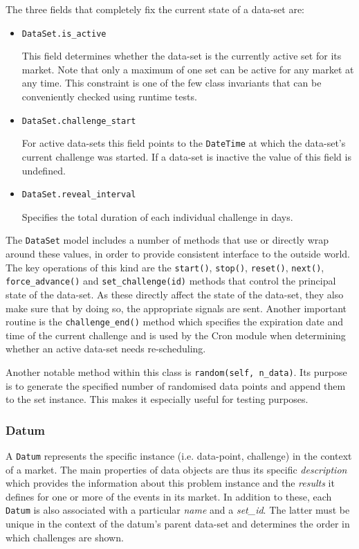 \documentclass[bsc,frontabs,twoside,singlespacing,parskip,deptreport]{infthesis}     %
\begin{document}
	The three fields that completely fix the current state of a data-set are:
\begin{itemize}

\item {\tt DataSet.is\_active}

	This field determines whether the data-set is the currently active set for its market. Note that only a maximum of one set can be active for any market at any time. This constraint is one of the few class invariants that can be conveniently checked using runtime tests. 

\item {\tt DataSet.challenge\_start}

	For active data-sets this field points to the {\tt DateTime} at which the data-set's current challenge was started. If a data-set is inactive the value of this field is undefined. 

\item {\tt DataSet.reveal\_interval}

	Specifies the total duration of each individual challenge in days. 

\end{itemize}

	The {\tt DataSet} model includes a number of methods that use or directly wrap around these values, in order to provide consistent interface to the outside world. The key operations of this kind are the {\tt start()}, {\tt stop()}, {\tt reset()}, {\tt next()}, {\tt force\_advance()} and {\tt set\_challenge(id)} methods that control the principal state of the data-set. As these directly affect the state of the data-set, they also make sure that by doing so, the appropriate signals are sent. Another important routine is the {\tt challenge\_end()} method which specifies the expiration date and time of the current challenge and is used by the Cron module when determining whether an active data-set needs re-scheduling. 

	Another notable method within this class is {\tt random(self, n\_data)}. Its purpose is to generate the specified number of randomised data points and append them to the set instance. This makes it especially useful for testing purposes. 
    
\subsubsection{Datum}

	A {\tt Datum} represents the specific instance (i.e. data-point, challenge) in the context of a market. The main properties of   data objects are thus its specific {\em description} which provides the information about this problem instance and the {\em results} it defines for one or more of the events in its market. In addition to these, each {\tt Datum} is also associated with a particular {\it name} and a {\it set\_id}. The latter must be unique in the context of the datum's parent data-set and determines the order in which challenges are shown. 
\end{document}
